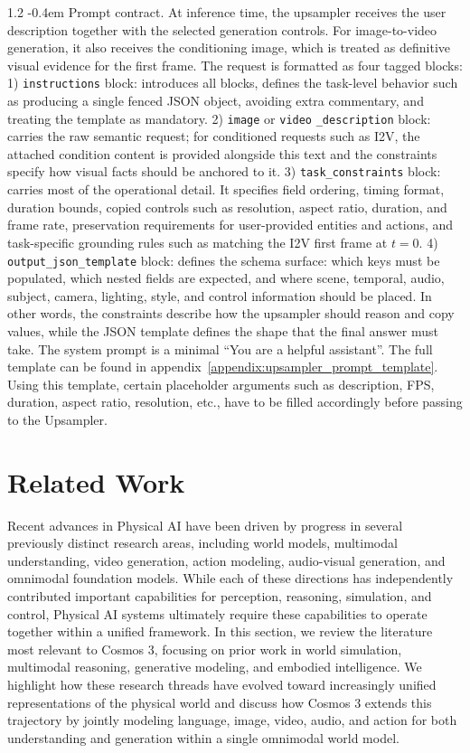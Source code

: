 \documentclass{llmxive}
\makeatletter
\providecommand{\etc}{etc.\xspace}
\providecommand{\paragraph}{  \@startsection{paragraph}{4}{\z@}    {1\baselineskip \@plus .2\baselineskip}    {-0.4em}    {\normalfont\normalsize\bfseries}}
\makeatother
\begin{document}
\paragraph{Prompt contract.}
At inference time, the upsampler receives the user description together with the selected generation controls. For image-to-video generation, it also receives the conditioning image, which is treated as definitive visual evidence for the first frame. The request is formatted as four tagged blocks: 1) \texttt{instructions} block: introduces all blocks, defines the task-level behavior such as producing a single fenced JSON object, avoiding extra commentary, and treating the template as mandatory. 2) \texttt{image} or \texttt{video} \texttt{\_description} block: carries the raw semantic request; for conditioned requests such as I2V, the attached condition content is provided alongside this text and the constraints specify how visual facts should be anchored to it. 3) \texttt{task\_constraints} block: carries most of the
operational detail. It specifies field ordering, timing format, duration bounds, copied controls such as resolution, aspect ratio, duration, and frame rate, preservation requirements for user-provided entities and actions, and task-specific grounding rules such as matching the I2V first frame at \(t=0\). 4) \texttt{output\_json\_template} block: defines the schema surface: which keys must be populated, which nested fields are expected, and where scene, temporal, audio, subject, camera, lighting, style, and control information should be placed. In other words, the constraints describe how the upsampler should reason and copy values, while the JSON template defines the shape that the final answer
must take. The system prompt is a minimal ``You are a helpful assistant''. The full template can be found in appendix~\ref{appendix:upsampler_prompt_template}. Using this template, certain placeholder arguments such as description, FPS, duration, aspect ratio, resolution, \etc, have to be filled accordingly before passing to the Upsampler.


\section{Related Work}
\label{sec::related_work}

Recent advances in Physical AI have been driven by progress in several previously distinct research areas, including world models, multimodal understanding, video generation, action modeling, audio-visual generation, and omnimodal foundation models. While each of these directions has independently contributed important capabilities for perception, reasoning, simulation, and control, Physical AI systems ultimately require these capabilities to operate together within a unified framework. In this section, we review the literature most relevant to Cosmos 3, focusing on prior work in world simulation, multimodal reasoning, generative modeling, and embodied intelligence. We highlight how these research threads have evolved toward increasingly unified representations of the physical world and discuss how Cosmos 3 extends this trajectory by jointly modeling language, image, video, audio, and action for both understanding and generation within a single omnimodal world model.
\end{document}
